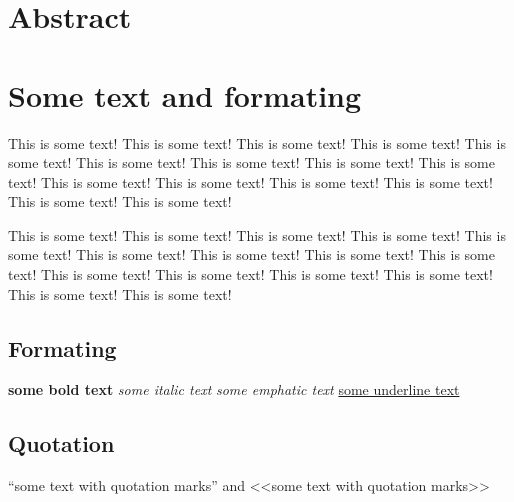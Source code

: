 
\title{}
\author{max-wn}
\date{April 12, 1961}



\maketitle
\tableofcontents

\section{Abstract}
\begin{abstract}
    This is some text! This is some text! This is some text! This is some
    text! This is some text! This is some text! This is some text! This is
    some text! This is some text! This is some text! This is some text! This
    is some text! This is some text! This is some text! This is some text!
\end{abstract}

\section{Some text and formating}
    This is some text! This is some text! This is some text! This is some
    text! This is some text! This is some text! This is some text! This is
    some text! This is some text! This is some text! This is some text! This
    is some text! This is some text! This is some text! This is some text!

    This is some text! This is some text! This is some text! This is some
    text! This is some text! This is some text! This is some text! This is
    some text! This is some text! This is some text! This is some text! This
    is some text! This is some text! This is some text! This is some text!

\subsection{Formating}
\textbf{some bold text}
\textit{some italic text}
\emph{some emphatic text}
\underline{some underline text}

\subsection{Quotation}
``some text with quotation marks'' and  <<some text with quotation marks>>

